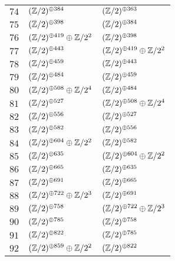 \begin{supertabular}{|c|p{5.5cm}|p{5.5cm}|}
$74$%
&$(\mathbb{Z}/2)^{\oplus384}$%
&$(\mathbb{Z}/2)^{\oplus363}$\\

$75$%
&$(\mathbb{Z}/2)^{\oplus398}$%
&$(\mathbb{Z}/2)^{\oplus384}$\\

$76$%
&$(\mathbb{Z}/2)^{\oplus419}\oplus\mathbb{Z}/2^{2}$%
&$(\mathbb{Z}/2)^{\oplus398}$\\

$77$%
&$(\mathbb{Z}/2)^{\oplus443}$%
&$(\mathbb{Z}/2)^{\oplus419}\oplus\mathbb{Z}/2^{2}$\\

$78$%
&$(\mathbb{Z}/2)^{\oplus459}$%
&$(\mathbb{Z}/2)^{\oplus443}$\\

$79$%
&$(\mathbb{Z}/2)^{\oplus484}$%
&$(\mathbb{Z}/2)^{\oplus459}$\\

$80$%
&$(\mathbb{Z}/2)^{\oplus508}\oplus\mathbb{Z}/2^{4}$%
&$(\mathbb{Z}/2)^{\oplus484}$\\

$81$%
&$(\mathbb{Z}/2)^{\oplus527}$%
&$(\mathbb{Z}/2)^{\oplus508}\oplus\mathbb{Z}/2^{4}$\\

$82$%
&$(\mathbb{Z}/2)^{\oplus556}$%
&$(\mathbb{Z}/2)^{\oplus527}$\\

$83$%
&$(\mathbb{Z}/2)^{\oplus582}$%
&$(\mathbb{Z}/2)^{\oplus556}$\\

$84$%
&$(\mathbb{Z}/2)^{\oplus604}\oplus\mathbb{Z}/2^{2}$%
&$(\mathbb{Z}/2)^{\oplus582}$\\

$85$%
&$(\mathbb{Z}/2)^{\oplus635}$%
&$(\mathbb{Z}/2)^{\oplus604}\oplus\mathbb{Z}/2^{2}$\\

$86$%
&$(\mathbb{Z}/2)^{\oplus665}$%
&$(\mathbb{Z}/2)^{\oplus635}$\\

$87$%
&$(\mathbb{Z}/2)^{\oplus691}$%
&$(\mathbb{Z}/2)^{\oplus665}$\\

$88$%
&$(\mathbb{Z}/2)^{\oplus722}\oplus\mathbb{Z}/2^{3}$%
&$(\mathbb{Z}/2)^{\oplus691}$\\

$89$%
&$(\mathbb{Z}/2)^{\oplus758}$%
&$(\mathbb{Z}/2)^{\oplus722}\oplus\mathbb{Z}/2^{3}$\\

$90$%
&$(\mathbb{Z}/2)^{\oplus785}$%
&$(\mathbb{Z}/2)^{\oplus758}$\\

$91$%
&$(\mathbb{Z}/2)^{\oplus822}$%
&$(\mathbb{Z}/2)^{\oplus785}$\\

$92$%
&$(\mathbb{Z}/2)^{\oplus859}\oplus\mathbb{Z}/2^{2}$%
&$(\mathbb{Z}/2)^{\oplus822}$\\


\end{supertabular}
